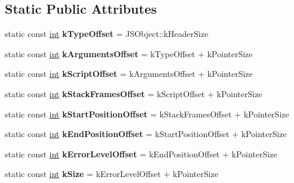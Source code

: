 \subsection*{Static Public Attributes}
\begin{DoxyCompactItemize}
\item 
\mbox{\label{classv8_1_1internal_1_1JSMessageObject_abb3ff5762da76ef2233e253060fa1c7f}} 
static const \mbox{\hyperlink{classint}{int}} {\bfseries k\+Type\+Offset} = J\+S\+Object\+::k\+Header\+Size
\item 
\mbox{\label{classv8_1_1internal_1_1JSMessageObject_afbd05eb4a6dc5620913a1f25efdd9f90}} 
static const \mbox{\hyperlink{classint}{int}} {\bfseries k\+Arguments\+Offset} = k\+Type\+Offset + k\+Pointer\+Size
\item 
\mbox{\label{classv8_1_1internal_1_1JSMessageObject_a56601869f06fd680de6f217db4abf7dc}} 
static const \mbox{\hyperlink{classint}{int}} {\bfseries k\+Script\+Offset} = k\+Arguments\+Offset + k\+Pointer\+Size
\item 
\mbox{\label{classv8_1_1internal_1_1JSMessageObject_ab52f9e48cf5e1bc47d7a05f7448f9593}} 
static const \mbox{\hyperlink{classint}{int}} {\bfseries k\+Stack\+Frames\+Offset} = k\+Script\+Offset + k\+Pointer\+Size
\item 
\mbox{\label{classv8_1_1internal_1_1JSMessageObject_a823062d07d7010b29e0cf03af96d12f5}} 
static const \mbox{\hyperlink{classint}{int}} {\bfseries k\+Start\+Position\+Offset} = k\+Stack\+Frames\+Offset + k\+Pointer\+Size
\item 
\mbox{\label{classv8_1_1internal_1_1JSMessageObject_aa114b54714631cf3068b62e3fee2498f}} 
static const \mbox{\hyperlink{classint}{int}} {\bfseries k\+End\+Position\+Offset} = k\+Start\+Position\+Offset + k\+Pointer\+Size
\item 
\mbox{\label{classv8_1_1internal_1_1JSMessageObject_af1ed556ac78627892dc1e8532899c4db}} 
static const \mbox{\hyperlink{classint}{int}} {\bfseries k\+Error\+Level\+Offset} = k\+End\+Position\+Offset + k\+Pointer\+Size
\item 
\mbox{\label{classv8_1_1internal_1_1JSMessageObject_ab27256e0a1d2d413a2d87163ff29efe3}} 
static const \mbox{\hyperlink{classint}{int}} {\bfseries k\+Size} = k\+Error\+Level\+Offset + k\+Pointer\+Size
\end{DoxyCompactItemize}
